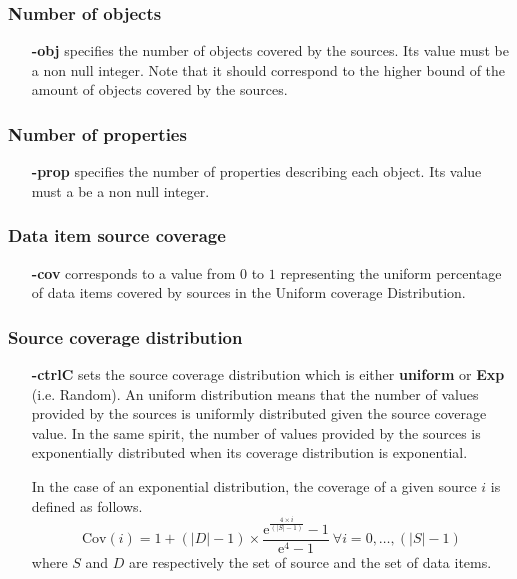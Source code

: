 \documentclass[a4paper,10pt]{scrartcl}
\newcommand{\cov}[1]{\ensuremath{\mathrm{Cov}(#1)}}
\newcommand{\expo}[1]{\ensuremath{\mathrm{e}^{#1}}}
\begin{document}
\subsubsection{Number of objects}
 \begin{itemize}
 \item[\textbf{-obj}] specifies the number of objects covered by the sources. Its value must be a non null integer.
 Note that it should correspond to the higher bound of the amount of objects covered by the sources.
 \end{itemize}
\subsubsection{Number of properties}
 \begin{itemize}
 \item[\textbf{-prop}] specifies the number of properties describing each object. Its value must a be a non null integer.
 \end{itemize}
 \subsubsection{Data item source coverage}
 \begin{itemize}
 \item[\textbf{-cov}] corresponds to a value from $0$ to $1$ representing the uniform percentage 
 of data items covered by sources in the Uniform coverage Distribution.
\end{itemize}
\subsubsection{Source coverage distribution}
\begin{itemize}
\item[\textbf{-ctrlC}] sets the source coverage distribution which is either \textbf{uniform} or \textbf{Exp} (i.e. Random).
 An uniform distribution means that the number of values provided by the sources is uniformly
 distributed given the source coverage value. In the same spirit, the number of values provided 
 by the sources is exponentially distributed when its coverage distribution is exponential.
 
 In the case of an exponential distribution, the coverage of a given source $i$ is defined as follows.
 \[
  \cov{i} = 1 + (|D|-1)\times \frac{\expo{\frac{4\times i}{(|S|-1)}} - 1}{\expo{4}-1}~\forall i=0,\ldots,(|S| -1)
 \]
where $S$ and $D$ are respectively the set of source and the set of data items. 
 
\end{itemize}
\end{document}
